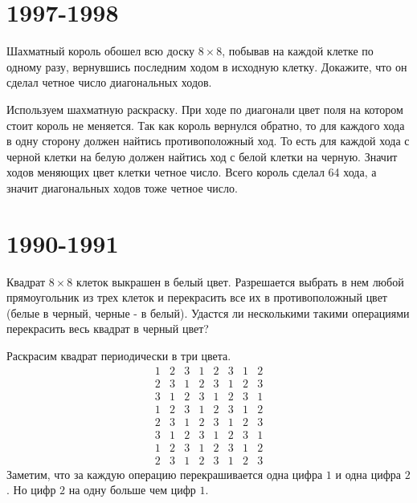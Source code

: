 \documentclass[11pt, a4paper]{template}
\begin{document}
\chapter{1997-1998}

\begin{exercise}
Шахматный король обошел всю доску $8 \times 8$, побывав на каждой клетке по одному разу, вернувшись последним ходом в исходную клетку. Докажите, что он сделал четное число диагональных ходов.
\end{exercise}

\begin{solution}
Используем шахматную раскраску. При ходе по диагонали цвет поля на котором стоит король не меняется. Так как король вернулся обратно, то для каждого хода в одну сторону должен найтись противоположный ход. То есть для каждой хода с черной клетки на белую должен найтись ход с белой клетки на черную. Значит ходов меняющих цвет клетки четное число. Всего король сделал 64 хода, а значит диагональных ходов тоже четное число. 
\end{solution}

\chapter{1990-1991}

\begin{exercise}
Квадрат $8 \times 8$ клеток выкрашен в белый цвет. Разрешается выбрать в нем любой прямоугольник из трех клеток и перекрасить все их в противоположный цвет (белые в черный, черные - в белый). Удастся ли несколькими такими операциями перекрасить весь квадрат в черный цвет?
\end{exercise}

\begin{solution}
Раскрасим квадрат периодически в три цвета.
$$
\begin{matrix}
1 & 2 & 3 & 1 & 2 & 3 & 1 & 2 \\
2 & 3 & 1 & 2 & 3 & 1 & 2 & 3 \\
3 & 1 & 2 & 3 & 1 & 2 & 3 & 1 \\
1 & 2 & 3 & 1 & 2 & 3 & 1 & 2 \\
2 & 3 & 1 & 2 & 3 & 1 & 2 & 3 \\
3 & 1 & 2 & 3 & 1 & 2 & 3 & 1 \\ 
1 & 2 & 3 & 1 & 2 & 3 & 1 & 2 \\
2 & 3 & 1 & 2 & 3 & 1 & 2 & 3 
\end{matrix}
$$
Заметим, что за каждую операцию перекрашивается одна цифра $1$ и одна цифра $2$. Но цифр $2$ на одну больше чем цифр $1$. 
\end{solution}
\end{document}
